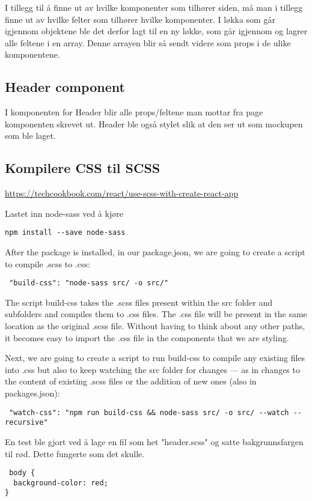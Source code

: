 I tillegg til å finne ut av hvilke komponenter som tilhører siden, må man i tillegg finne ut av hvilke felter som tilhører hvilke komponenter. I løkka som går igjennom objektene ble det derfor lagt til en ny løkke, som går igjennom og lagrer alle feltene i en array. Denne arrayen blir så sendt videre som props i de ulike komponentene.

\subsection{Header component}
I komponenten for Header blir alle props/feltene man mottar fra page komponenten skrevet ut. Header ble også stylet slik at den ser ut som mockupen som ble laget.

\subsection{Kompilere CSS til SCSS}
\url{https://techcookbook.com/react/use-scss-with-create-react-app}

Lastet inn node-sass ved å kjøre 

\begin{lstlisting}
npm install --save node-sass
\end{lstlisting}

After the package is installed, in our package.json, we are going to create a script to compile .scss to .css:

\begin{lstlisting}
 "build-css": "node-sass src/ -o src/"
\end{lstlisting}
\clearpage

The script build-css takes the .scss files present within the src folder and subfolders and compiles them to .css files. The .css file will be present in the same location as the original .scss file. Without having to think about any other paths, it becomes easy to import the .css file in the components that we are styling.

Next, we are going to create a script to run build-css to compile any existing files into .css but also to keep watching the src folder for changes — as in changes to the content of existing .scss files or the addition of new ones (also in packages.json):

\begin{lstlisting}
 "watch-css": "npm run build-css && node-sass src/ -o src/ --watch --recursive"
\end{lstlisting}

En test ble gjort ved å lage en fil som het "header.scss" og satte bakgrunnsfargen til rød. Dette fungerte som det skulle.

\begin{lstlisting}
 body {
  background-color: red;
}
\end{lstlisting}
